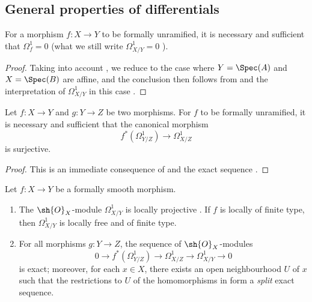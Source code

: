 \subsection{General properties of differentials}
\label{subsection:IV.17.2}

\begin{proposition}[17.2.1]
\label{IV.17.2.1}
For a morphism $f:X\to Y$ to be formally unramified, it is necessary and sufficient that $\Omega_f^1=0$ (what we still write $\Omega_{X/Y}^1=0$ ).  
\end{proposition}

\begin{proof}
Taking into account , we reduce to the case where $Y=\Spec(A)$ and $X=\Spec(B)$ are affine, and the conclusion then follows from  and the interpretation of $\Omega_{X/Y}^1$ in this case .
\end{proof}

\begin{corollary}[17.2.2]
\label{IV.17.2.2}
Let $f:X\to Y$ and $g:Y\to Z$ be two morphisms. 
For $f$ to be formally unramified, it is necessary and sufficient that the canonical morphism 
\[
  f^*(\Omega^1_{Y/Z})\to \Omega^1_{X/Z}
\] is surjective.
\end{corollary}

\begin{proof}
This is an immediate consequence of  and the exact sequence .
\end{proof}

\begin{proposition}[17.2.3]
\label{IV.17.2.3}
Let $f:X\to Y$ be a formally smooth morphism.
\begin{enumerate}
  \item[{\rm(i)}] The $\sh{O}_X$-module $\Omega_{X/Y}^1$ is locally projective .
    If $f$ is locally of finite type, then $\Omega_{X/Y}^1$ is locally free and of finite type.
  \item[{\rm(ii)}] For all morphisms $g:Y\to Z$, the sequence  of $\sh{O}_X$-modules
\[
\label{IV.17.2.3.1}
  0\to f^*(\Omega_{Y/Z}^1)\to\Omega_{X/Z}^1\to\Omega_{X/Y}^1\to 0
  \tag{17.2.3.1}
\]
is exact; moreover, for each $x\in X$, there exists an open neighbourhood $U$ of $x$ such that the restrictions to $U$ of the homomorphisms in  form a \emph{split} exact sequence.
\end{enumerate}
\end{proposition}

